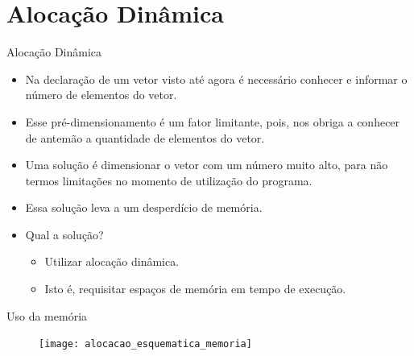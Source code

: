 \section{Alocação Dinâmica}
\begin{frame}[c]{Alocação Dinâmica}
  \begin{itemize}[<+->]
    \item Na declaração de um vetor visto até agora é necessário conhecer e informar o número de elementos do vetor.
    \item Esse pré-dimensionamento é um fator limitante, pois, nos obriga a conhecer de antemão a quantidade de elementos do vetor.
    \item Uma solução é dimensionar o vetor com um número muito alto, para não termos limitações no momento de utilização do programa.
    \item Essa solução leva a um desperdício de memória.
    \item Qual a solução?   
    \begin{itemize}[<+->]
      \item Utilizar alocação dinâmica.
      \item Isto é, requisitar espaços de memória em tempo de execução.
    \end{itemize}
  \end{itemize}
\end{frame}

\begin{frame}[plain,c]{Uso da memória}  
  \begin{figure}[ht]
      \centering
      \texttt{[image: alocacao\_esquematica\_memoria]}
  \end{figure}
\end{frame}

